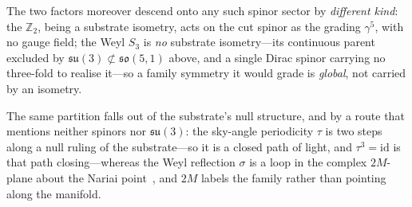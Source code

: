 \documentclass[11pt,a4paper]{article}
\theoremstyle{plain}
\theoremstyle{definition}
\theoremstyle{remark}
\begin{document}
The two factors moreover descend onto any such spinor sector by \emph{different kind}: the $\mathbb{Z}_2$, being a substrate isometry, acts on the cut spinor as the grading $\gamma^5$, with no gauge field; the Weyl $S_3$ is \emph{no} substrate isometry---its continuous parent excluded by $\mathfrak{su}(3)\not\subset\mathfrak{so}(5,1)$ above, and a single Dirac spinor carrying no three-fold to realise it---so a family symmetry it would grade is \emph{global}, not carried by an isometry. 

The same partition falls out of the substrate's null structure, and by a route that mentions neither spinors nor $\mathfrak{su}(3)$: the sky-angle periodicity $\tau$ is two steps along a null ruling of the substrate---so it is a closed path of light, and $\tau^{3}=\mathrm{id}$ is that path closing---whereas the Weyl reflection $\sigma$ is a loop in the complex $2M$-plane about the Nariai point~\cite{JanzenGroupoid}, and $2M$ labels the family rather than pointing along the manifold. 
\end{document}
